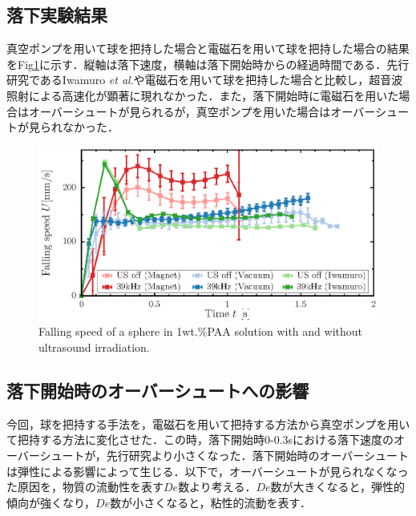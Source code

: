 
\subsection{落下実験結果}

真空ポンプを用いて球を把持した場合と電磁石を用いて球を把持した場合の結果をFig\ref{fig:falling-A}に示す．縦軸は落下速度，横軸は落下開始時からの経過時間である．先行研究であるIwamuro \textit{et al}.\cite{ref:8}や電磁石を用いて球を把持した場合と比較し，超音波照射による高速化が顕著に現れなかった．また，落下開始時に電磁石を用いた場合はオーバーシュートが見られるが，真空ポンプを用いた場合はオーバーシュートが見られなかった．

\begin{figure}[ht]
    \centering
    \includegraphics[width=1\textwidth]{./X-Appendix/magnet_vacuum/magnet_vacuum.eps}
    \caption{Falling speed of a sphere in 1wt.\%PAA solution with and without ultrasound irradiation.}
    \label{fig:falling-A}
\end{figure}


\subsection{落下開始時のオーバーシュートへの影響}
\label{sec:dis-de}

今回，球を把持する手法を，電磁石を用いて把持する方法から真空ポンプを用いて把持する方法に変化させた．この時，落下開始時0-0.3sにおける落下速度のオーバーシュートが，先行研究\cite{ref:8,ref:9}より小さくなった．落下開始時のオーバーシュートは弾性による影響によって生じる\cite{ref:12}．以下で，オーバーシュートが見られなくなった原因を，物質の流動性を表す$De$数より考える．$De$数が大きくなると，弾性的傾向が強くなり，$De$数が小さくなると，粘性的流動を表す．

